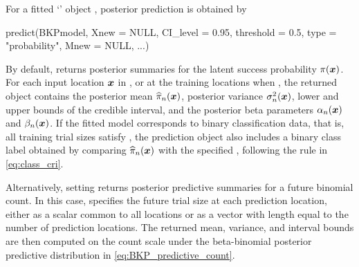 \documentclass[article, shortnames]{jss}
\newcommand{\class}[1]{`\code{#1}'}
\renewcommand{\vec}[1]{\mbox{\boldmath ${#1}$}}
\begin{document}
For a fitted \class{BKP} object , posterior prediction is obtained by
\begin{Code}
predict(BKPmodel, Xnew = NULL, CI_level = 0.95, threshold = 0.5,
	type = "probability", Mnew = NULL, ...)
\end{Code}
By default,  returns posterior summaries for the latent success probability $\pi(\vec{x})$. For each input location $\vec{x}$ in , or at the training locations when , the returned object contains the posterior mean $\widehat{\pi}_n(\vec{x})$, posterior variance $\sigma_n^2(\vec{x})$, lower and upper bounds of the  credible interval, and the posterior beta parameters $\alpha_n(\vec{x})$ and $\beta_n(\vec{x})$. If the fitted model corresponds to binary classification data, that is, all training trial sizes satisfy , the prediction object also includes a binary class label obtained by comparing $\widehat{\pi}_n(\vec{x})$ with the specified , following the rule in \eqref{eq:class_cri}.

Alternatively, setting  returns posterior predictive summaries for a future binomial count. In this case,  specifies the future trial size at each prediction location, either as a scalar common to all locations or as a vector with length equal to the number of prediction locations. The returned mean, variance, and interval bounds are then computed on the count scale under the beta-binomial posterior predictive distribution in \eqref{eq:BKP_predictive_count}.
\end{document}
